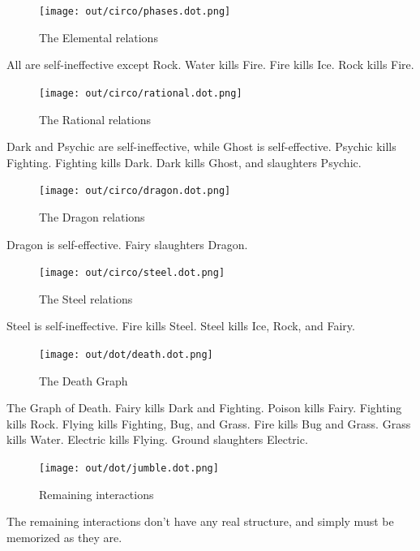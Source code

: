 \begin{figure}[h]
\centering
\texttt{[image: out/circo/phases.dot.png]}
\caption{The Elemental relations}
\end{figure}
All are self-ineffective except Rock.
Water kills Fire.
Fire kills Ice.
Rock kills Fire.

\begin{figure}[h]
\centering
\texttt{[image: out/circo/rational.dot.png]}
\caption{The Rational relations}
\end{figure}
Dark and Psychic are self-ineffective, while Ghost is self-effective.
Psychic kills Fighting.
Fighting kills Dark.
Dark kills Ghost, and slaughters Psychic.

\begin{figure}
\centering
\texttt{[image: out/circo/dragon.dot.png]}
\caption{The Dragon relations}
\end{figure}
Dragon is self-effective.
Fairy slaughters Dragon.

\begin{figure}
\centering
\texttt{[image: out/circo/steel.dot.png]}
\caption{The Steel relations}
\end{figure}
Steel is self-ineffective.
Fire kills Steel.
Steel kills Ice, Rock, and Fairy.

\begin{figure}[h]
\centering
\texttt{[image: out/dot/death.dot.png]}
\caption{The Death Graph}
\end{figure}
The Graph of Death.
Fairy kills Dark and Fighting.
Poison kills Fairy.
Fighting kills Rock.
Flying kills Fighting, Bug, and Grass.
Fire kills Bug and Grass.
Grass kills Water.
Electric kills Flying.
Ground slaughters Electric.

\begin{figure}[h]
\centering
\texttt{[image: out/dot/jumble.dot.png]}
\caption{Remaining interactions}
\end{figure}
The remaining interactions don't have any real structure, and simply must be
memorized as they are.
